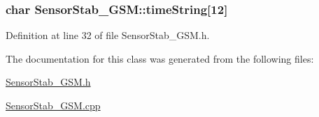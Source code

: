 \subsubsection[{\texorpdfstring{time\+String}{timeString}}]{\setlength{\rightskip}{0pt plus 5cm}char Sensor\+Stab\+\_\+\+G\+S\+M\+::time\+String\mbox{[}12\mbox{]}\hspace{0.3cm}{\ttfamily [private]}}\hypertarget{class_sensor_stab___g_s_m_a26b89fe7f887da9667ca9045a81f6899}{}\label{class_sensor_stab___g_s_m_a26b89fe7f887da9667ca9045a81f6899}


Definition at line 32 of file Sensor\+Stab\+\_\+\+G\+S\+M.\+h.



The documentation for this class was generated from the following files\+:\begin{DoxyCompactItemize}
\item 
\hyperlink{_sensor_stab___g_s_m_8h}{Sensor\+Stab\+\_\+\+G\+S\+M.\+h}\item 
\hyperlink{_sensor_stab___g_s_m_8cpp}{Sensor\+Stab\+\_\+\+G\+S\+M.\+cpp}\end{DoxyCompactItemize}

